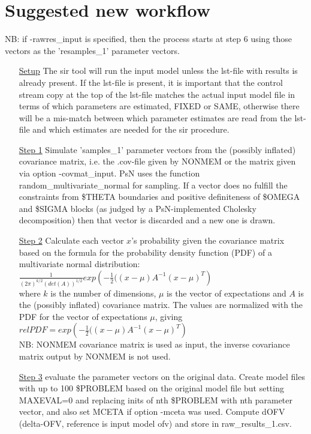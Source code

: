 \section{Suggested new workflow}
NB: if -rawres\_input is specified, then the process starts
at step 6 using those vectors as the 'resamples\_1' parameter vectors.
\begin{itemize}
\item[\underline{Setup}] The sir tool will run the input model unless the lst-file with results is already present.
If the lst-file is present, it
is important that the control stream copy at the top of the lst-file matches the
actual input model file in terms of which parameters are estimated,
FIXED or SAME, otherwise there will be a mis-match between which parameter estimates are read from the
lst-file and which estimates are needed for the sir procedure.
\item[\underline{Step 1}] Simulate 'samples\_1' parameter vectors from the
(possibly inflated)
covariance matrix, i.e. the .cov-file given by NONMEM
or the matrix given via option -covmat\_input. PsN uses the function\\
random\_multivariate\_normal
for sampling. If a vector does no fulfill the constraints from \$THETA boundaries
and positive definiteness of \$OMEGA and
\$SIGMA blocks (as judged by a PsN-implemented Cholesky decomposition)
then that vector is
discarded and a new one is drawn.
\item[\underline{Step 2}] Calculate each vector $x$’s probability
given the covariance matrix based on the formula for the probability
density function (PDF) of a multivariate normal distribution:\\
\begin{math}
\frac{1}{\left(2\pi\right)^{k/2}\left(det\left(A\right)\right)^{1/2}} exp\left(-\frac{1}{2}(\left(x-\mu\right)A^{-1} \left(x-\mu\right)^T\right)
\end{math}
\\
where $k$ is the number of dimensions,
$\mu$ is the vector of expectations and $A$ is the (possibly inflated) covariance matrix.
The values are normalized with the PDF for the vector of expectations $\mu$, giving\\
\begin{math}
relPDF=exp\left(-\frac{1}{2}(\left(x-\mu\right)A^{-1} \left(x-\mu\right)^T\right)
\end{math}
\\
NB: NONMEM covariance matrix is used as input, the inverse covariance matrix
output by NONMEM is not used.
\item[\underline{Step 3}] evaluate the parameter vectors on the original data.
Create model files with up to 100 \$PROBLEM based on the original model file but setting MAXEVAL=0
and replacing inits of nth \$PROBLEM with nth parameter vector, and also set MCETA if option -mceta was used. Compute dOFV
(delta-OFV, reference is input model ofv) and store in raw\_results\_1.csv.


\end{itemize}
